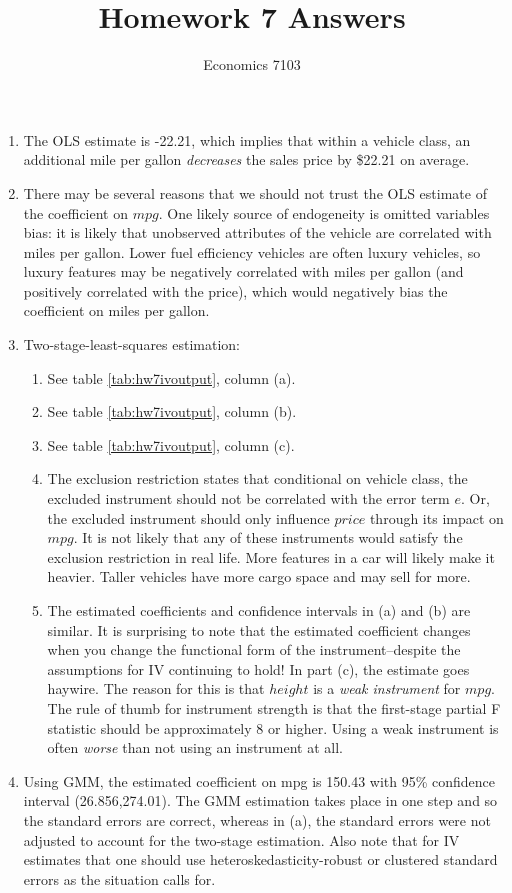 \documentclass{article}
\title{Homework 7 Answers}
\author{Economics 7103}
\date{ }
\begin{document}
  
\maketitle

\begin{enumerate}
    \item The OLS estimate is -22.21, which implies that within a vehicle class, an additional mile per gallon \textit{decreases} the sales price by \$22.21 on average.
    \item There may be several reasons that we should not trust the OLS estimate of the coefficient on $mpg$.  One likely source of endogeneity is omitted variables bias: it is likely that unobserved attributes of the vehicle are correlated with miles per gallon.  Lower fuel efficiency vehicles are often luxury vehicles, so luxury features may be negatively correlated with miles per gallon (and positively correlated with the price), which would negatively bias the coefficient on miles per gallon.
    \item Two-stage-least-squares estimation:
\begin{enumerate}[label=(\alph*)]
    \item See table \ref{tab:hw7ivoutput}, column (a).
    \item See table \ref{tab:hw7ivoutput}, column (b).
    \item See table \ref{tab:hw7ivoutput}, column (c).
    \item The exclusion restriction states that conditional on vehicle class, the excluded instrument should not be correlated with the error term $e$.  Or, the excluded instrument should only influence $price$ through its impact on $mpg$.  It is not likely that any of these instruments would satisfy the exclusion restriction in real life.  More features in a car will likely make it heavier.  Taller vehicles have more cargo space and may sell for more.
    \item The estimated coefficients and confidence intervals in (a) and (b) are similar.  It is surprising to note that the estimated coefficient changes when you change the functional form of the instrument--despite the assumptions for IV continuing to hold!  In part (c), the estimate goes haywire.  The reason for this is that $height$ is a \textit{weak instrument} for $mpg$.  The rule of thumb for instrument strength is that the first-stage partial F statistic should be approximately 8 or higher.  Using a weak instrument is often \textit{worse} than not using an instrument at all. 
\end{enumerate}
\item Using GMM, the estimated coefficient on mpg is 150.43 with 95\% confidence interval (26.856,274.01).  The GMM estimation takes place in one step and so the standard errors are correct, whereas in (a), the standard errors were not adjusted to account for the two-stage estimation.  Also note that for IV estimates that one should use heteroskedasticity-robust or clustered standard errors as the situation calls for.
\end{enumerate}
\end{document}

